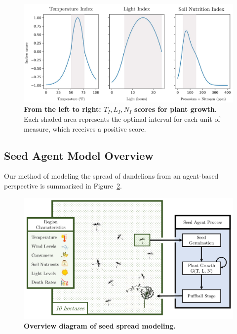 \begin{figure}[h!]
\centering
    \includegraphics[scale=0.5]{figures/scoreindex.pdf}
    \captionsetup{width=0.9\textwidth}
    \caption{\textbf{From the left to right: \(T_I, L_I, N_I\) scores for plant growth.} Each shaded area represents the optimal interval for each unit of measure, which receives a positive score.}
    \label{fig:indexscoregraphs}
\end{figure}

\subsection{Seed Agent Model Overview}

Our method of modeling the spread of dandelions from an agent-based perspective is summarized in Figure~\ref{fig:partadiagram}.

\begin{figure}[h!]
\centering
    \includegraphics[scale=0.8]{figures/seedspreadprocess2.pdf}
    \captionsetup{width=0.9\textwidth}
    \caption{\textbf{Overview diagram of seed spread modeling.} }
    \label{fig:partadiagram}
\end{figure}